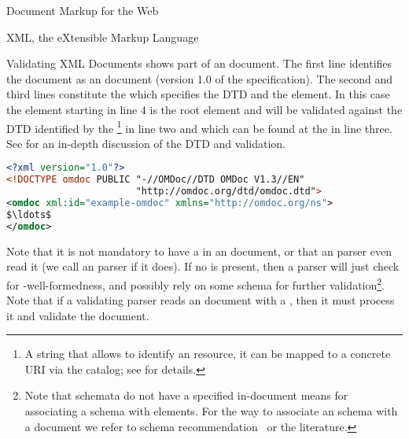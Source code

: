 \begin{tchapter}[id=markup-web]{Document Markup for the Web}
\begin{tsection}[id=xml]{XML, the eXtensible Markup Language}
\begin{tsubsection}[id=xml-validation,short=Validating XML Doucments]{Validating XML Documents}
  {} shows part of an {\omdoc} document. The first line identifies the
  document as an {\xml} document (version 1.0 of the {\xml} specification).  The second
  and third lines constitute the {} which specifies
  the DTD and the {} element. In this case the {}
  element starting in line 4 is the root element and will be validated against the DTD
  identified by the {}\footnote{A string that allows to
    identify an {\xml} resource, it can be mapped to a concrete URI via the {\xml}
    catalog; see {} for details.} in line two and
  which can be found at the {} in line three. See {}
  for an in-depth discussion of the {\omdoc} DTD and validation.

\begin{lstlisting}[label=lst:xml-dtd,language=XML,morekeywords={omdoc},mathescape,
  caption={The Structure of an {\xml} Document with DTD},
  index={xml,DOCTYPE,omdoc}
  index={[2]xmlns,xmlns:xsi,xsi:schemaLocation}]
<?xml version="1.0"?> 
<!DOCTYPE omdoc PUBLIC "-//OMDoc//DTD OMDoc V1.3//EN"
                       "http://omdoc.org/dtd/omdoc.dtd"> 
<omdoc xml:id="example-omdoc" xmlns="http://omdoc.org/ns"> 
$\ldots$
</omdoc>
\end{lstlisting}
  Note that it is not mandatory to have a {} in an
  {\xml} document, or that an {\xml} parser even read it (we call an {\xml} parser
  {} if it does). If no
  {} is present, then a parser will just check for
  {\xml}-well-formedness, and possibly rely on some schema for further
  validation\footnote{Note that {\relaxng} schemata do not have a specified in-document
    means for associating a schema with elements. For the way to associate an {\xml}
    schema with a document we refer to {\xml} schema recommendation~\cite{XML:Schema} or
    the {\xml} literature.}.  Note that if a validating parser reads an {\xml} document
  with a {}, then it must process it and validate the
  document.


\end{tsubsection}
\end{tsection}
\end{tchapter}

